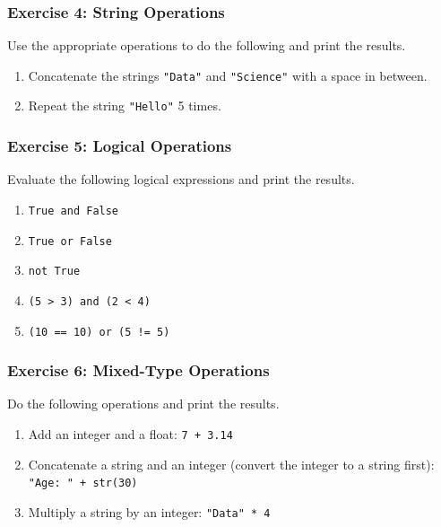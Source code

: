 \documentclass[
  letterpaper,
  DIV=11,
  numbers=noendperiod]{scrreprt}
\providecommand{\tightlist}{%
  \setlength{\itemsep}{0pt}\setlength{\parskip}{0pt}}\usepackage{longtable,booktabs,array}
\begin{document}
\hypertarget{exercise-4-string-operations}{%
\subsubsection{Exercise 4: String
Operations}\label{exercise-4-string-operations}}

Use the appropriate operations to do the following and print the
results.

\begin{enumerate}
\def\labelenumi{\alph{enumi}.}
\tightlist
\item
  Concatenate the strings \texttt{"Data"} and \texttt{"Science"} with a
  space in between.
\item
  Repeat the string \texttt{"Hello"} 5 times.
\end{enumerate}

\hypertarget{exercise-5-logical-operations}{%
\subsubsection{Exercise 5: Logical
Operations}\label{exercise-5-logical-operations}}

Evaluate the following logical expressions and print the results.

\begin{enumerate}
\def\labelenumi{\alph{enumi}.}
\tightlist
\item
  \texttt{True\ and\ False}
\item
  \texttt{True\ or\ False}
\item
  \texttt{not\ True}
\item
  \texttt{(5\ \textgreater{}\ 3)\ and\ (2\ \textless{}\ 4)}
\item
  \texttt{(10\ ==\ 10)\ or\ (5\ !=\ 5)}
\end{enumerate}

\hypertarget{exercise-6-mixed-type-operations}{%
\subsubsection{Exercise 6: Mixed-Type
Operations}\label{exercise-6-mixed-type-operations}}

Do the following operations and print the results.

\begin{enumerate}
\def\labelenumi{\alph{enumi}.}
\tightlist
\item
  Add an integer and a float: \texttt{7\ +\ 3.14}
\item
  Concatenate a string and an integer (convert the integer to a string
  first): \texttt{"Age:\ "\ +\ str(30)}
\item
  Multiply a string by an integer: \texttt{"Data"\ *\ 4}
\end{enumerate}
\end{document}
